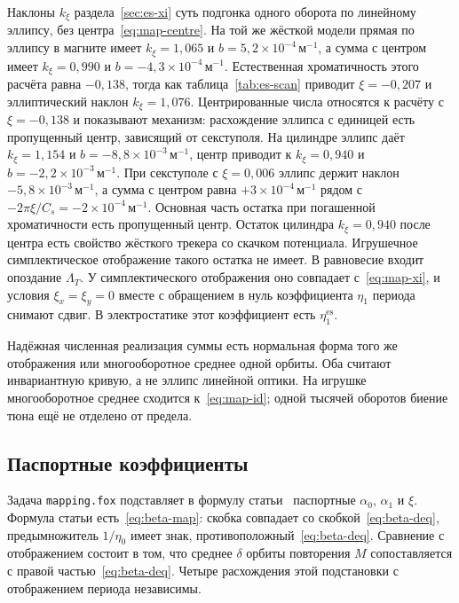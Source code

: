 \documentclass[aps,pra,preprint,a4paper,amsmath,amssymb,longbibliography]{revtex4-2}
\begin{document}
Наклоны $k_{\xi}$ раздела~\ref{sec:es-xi} суть подгонка одного оборота по линейному эллипсу, без центра~\eqref{eq:map-centre}. На той же жёсткой модели прямая по эллипсу в магните имеет $k_{\xi}=1{,}065$ и $b=5{,}2\times 10^{-4}\,\text{м}^{-1}$, а сумма с центром имеет $k_{\xi}=0{,}990$ и $b=-4{,}3\times 10^{-4}\,\text{м}^{-1}$. Естественная хроматичность этого расчёта равна $-0{,}138$, тогда как таблица~\ref{tab:es-scan} приводит $\xi=-0{,}207$ и эллиптический наклон $k_{\xi}=1{,}076$. Центрированные числа относятся к расчёту с $\xi=-0{,}138$ и показывают механизм: расхождение эллипса с единицей есть пропущенный центр, зависящий от секступоля. На цилиндре эллипс даёт $k_{\xi}=1{,}154$ и $b=-8{,}8\times 10^{-3}\,\text{м}^{-1}$, центр приводит к $k_{\xi}=0{,}940$ и $b=-2{,}2\times 10^{-3}\,\text{м}^{-1}$. При секступоле с $\xi=0{,}006$ эллипс держит наклон $-5{,}8\times 10^{-3}\,\text{м}^{-1}$, а сумма с центром равна $+3\times 10^{-4}\,\text{м}^{-1}$ рядом с $-2\pi\xi/C_s=-2\times 10^{-4}\,\text{м}^{-1}$. Основная часть остатка при погашенной хроматичности есть пропущенный центр. Остаток цилиндра $k_{\xi}=0{,}940$ после центра есть свойство жёсткого трекера со скачком потенциала. Игрушечное симплектическое отображение такого остатка не имеет. В равновесие входит опоздание $\Lambda_T$. У симплектического отображения оно совпадает с~\eqref{eq:map-xi}, и условия $\xi_x=\xi_y=0$ вместе с обращением в нуль коэффициента $\eta_1$ периода снимают сдвиг. В электростатике этот коэффициент есть $\eta_1^{\mathrm{es}}$.

Надёжная численная реализация суммы есть нормальная форма того же отображения или многооборотное среднее одной орбиты. Оба считают инвариантную кривую, а не эллипс линейной оптики. На игрушке многооборотное среднее сходится к~\eqref{eq:map-id}; одной тысячей оборотов биение тюна ещё не отделено от предела.

\subsection{Паспортные коэффициенты}
\label{sec:map-not}

Задача \texttt{mapping.fox} подставляет в формулу статьи~\cite{KolokolchikovMapping} паспортные $\alpha_0$, $\alpha_1$ и $\xi$. Формула статьи есть~\eqref{eq:beta-map}: скобка совпадает со скобкой~\eqref{eq:beta-deq}, предымножитель $1/\eta_0$ имеет знак, противоположный~\eqref{eq:beta-deq}. Сравнение с отображением состоит в том, что среднее $\delta$ орбиты повторения $M$ сопоставляется с правой частью~\eqref{eq:beta-deq}. Четыре расхождения этой подстановки с отображением периода независимы.
\end{document}
